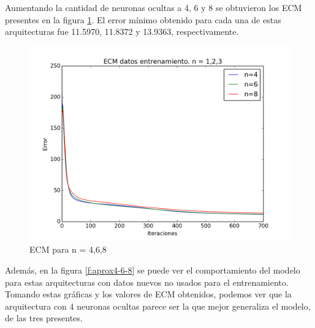 \documentclass[a4paper]{article}
\begin{document}
Aumentando la cantidad de neuronas ocultas a 4, 6 y 8 se obtuvieron los ECM presentes en la figura \ref{fig:n4-6-8_train}. El error mínimo obtenido para cada una de estas arquitecturas fue 11.5970, 11.8372 y 13.9363, respectivamente.
	
	\begin{figure}[H]
	\centering
	\includegraphics[scale=0.4]{graficas/n4-6-8_train.png}
	\caption{ECM para n = 4,6,8}
	\label{fig:n4-6-8_train}
	\end{figure}

Además, en la figura \ref{f:aprox4-6-8} se puede ver el comportamiento del modelo para estas arquitecturas con datos nuevos no usados para el entrenamiento. Tomando estas gráficas y los valores de ECM obtenidos, podemos ver que la arquitectura con 4 neuronas ocultas parece ser la que mejor generaliza el modelo, de las tres presentes.
\end{document}
